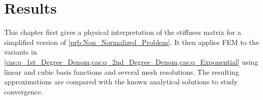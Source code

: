\chapter{Results} \label{cha:Results}
This chapter first gives a physical interpretation of the stiffness matrix for a simplified version of
\cref{prb:Non_Normalized_Problem}. It then applies FEM to the variants in
\cref{cas:q_1st_Degree_Denom,cas:q_2nd_Degree_Denom,cas:q_Exponential} using linear and cubic basis functions and several mesh
resolutions. The resulting approximations are compared with the known analytical solutions to study convergence.
%



